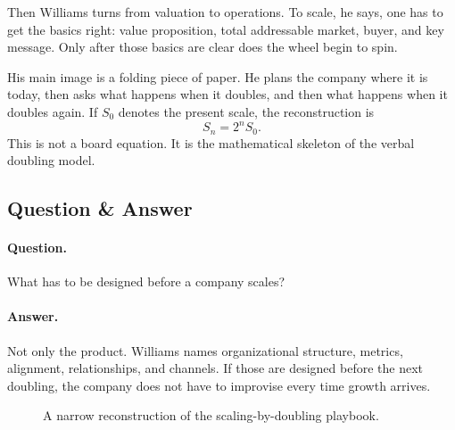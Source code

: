 Then Williams turns from valuation to operations. To scale, he says, one has to get the basics right: value proposition, total addressable market, buyer, and key message. Only after those basics are clear does the wheel begin to spin.

His main image is a folding piece of paper. He plans the company where it is today, then asks what happens when it doubles, and then what happens when it doubles again. If \(S_0\) denotes the present scale, the reconstruction is
\begin{equation}
S_n = 2^n S_0.
\end{equation}
This is not a board equation. It is the mathematical skeleton of the verbal doubling model.

\subsection{Question \& Answer}

\paragraph{Question.}
What has to be designed before a company scales?

\paragraph{Answer.}
Not only the product. Williams names organizational structure, metrics, alignment, relationships, and channels. If those are designed before the next doubling, the company does not have to improvise every time growth arrives.

\begin{figure}
\centering
{}
\caption{A narrow reconstruction of the scaling-by-doubling playbook.}
\end{figure}


